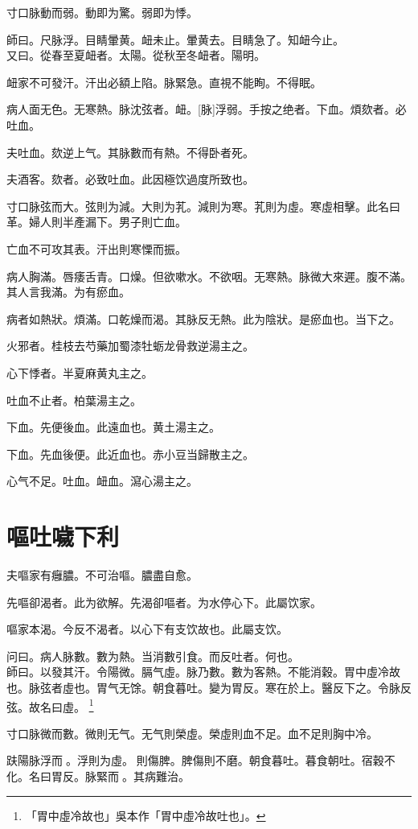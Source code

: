 \documentclass[11pt,oneside,b5paper]{ctexbook}
\begin{document}
\begin{flushleft}
寸口脉動而弱。動即为驚。弱即为悸。

師曰。尺脉浮。目睛暈黄。衄未止。暈黄去。目睛急了。知衄今止。\\
又曰。從春至夏衄者。太陽。從秋至冬衄者。陽明。

衄家不可發汗。汗出必額上陷。脉緊急。直視不能眴。不得眠。

病人面无色。无寒熱。脉沈弦者。衄。[脉]浮弱。手按之绝者。下血。煩欬者。必吐血。

夫吐血。欬逆上气。其脉數而有熱。不得卧者死。

夫酒客。欬者。必致吐血。此因極饮過度所致也。

寸口脉弦而大。弦則为減。大則为芤。減則为寒。芤則为虛。寒虛相擊。此名曰革。婦人則半產漏下。男子則亡血。

亡血不可攻其表。汗出則寒慄而振。

病人胸滿。唇痿舌青。口燥。但欲嗽水。不欲咽。无寒熱。脉微大來遲。腹不滿。其人言我滿。为有瘀血。

病者如熱狀。煩滿。口乾燥而渴。其脉反无熱。此为陰狀。是瘀血也。当下之。

火邪者。桂枝去芍藥加蜀漆牡蛎龙骨救逆湯主之。

心下悸者。半夏麻黄丸主之。

吐血不止者。柏葉湯主之。

下血。先便後血。此遠血也。黄土湯主之。

下血。先血後便。此近血也。赤小豆当歸散主之。

心气不足。吐血。衄血。瀉心湯主之。

\chapter{嘔吐噦下利}

夫嘔家有癰膿。不可治嘔。膿盡自愈。

先嘔卻渴者。此为欲解。先渴卻嘔者。为水停心下。此屬饮家。

嘔家本渴。今反不渴者。以心下有支饮故也。此屬支饮。

问曰。病人脉數。數为熱。当消數引食。而反吐者。何也。\\
師曰。以發其汗。令陽微。膈气虛。脉乃數。數为客熱。不能消穀。胃中虛冷故也。脉弦者虛也。胃气无馀。朝食暮吐。變为胃反。寒在於上。醫反下之。令脉反弦。故名曰虛。
\footnote{「胃中虛冷故也」吳本作「胃中虛冷故吐也」。}

寸口脉微而數。微則无气。无气則榮虛。榮虛則血不足。血不足則胸中冷。

趺陽脉浮而{𬈧}。浮則为虛。{𬈧}則傷脾。脾傷則不磨。朝食暮吐。暮食朝吐。宿穀不化。名曰胃反。脉緊而{𬈧}。其病難治。


\end{flushleft}
\end{document}
